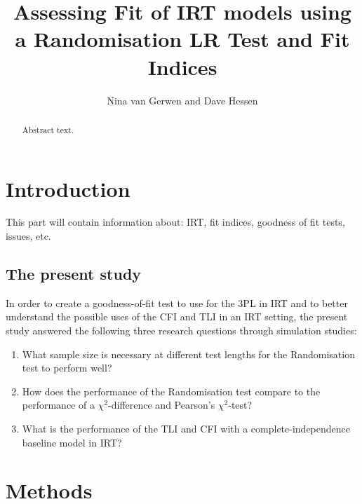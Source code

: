\documentclass[Royal,sageapa,times,doublespace]{sagej}
\begin{document}

\title{Assessing Fit of IRT models using a Randomisation LR Test and Fit Indices}

\author{Nina van Gerwen  and Dave Hessen}




\begin{abstract}
Abstract text.
\end{abstract}


\maketitle

\section{Introduction}
This part will contain information about: IRT, fit indices, goodness of fit tests, issues, etc.
\subsection{The present study}
In order to create a goodness-of-fit test to use for the 3PL in IRT and to better understand the possible uses of the CFI and TLI in an IRT setting, the present study answered the following three research questions through simulation studies:
\begin{enumerate}
\item{What sample size is necessary at different test lengths for the Randomisation test to perform well?}
\item{How does the performance of the Randomisation test compare to the performance of a $\chi^2$-difference and Pearson's $\chi^2$-test?}
\item{What is the performance of the TLI and CFI with a complete-independence baseline model in IRT?}
\end{enumerate}

\section{Methods}
\end{document}
